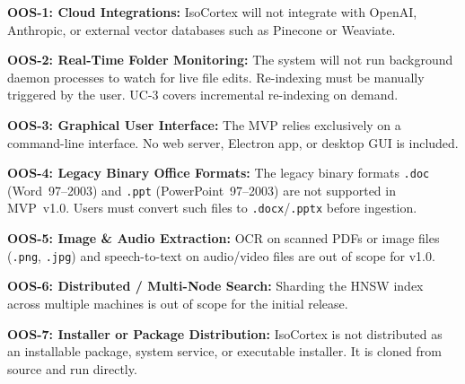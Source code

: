 \documentclass[12pt, a4paper]{article}
\begin{document}
\vspace{0.3cm}
\begin{tcolorbox}[enhanced, colback=white, colframe=alertRed,
    colbacktitle=red!5, coltitle=alertRed, boxrule=0.5pt, leftrule=4pt,
    arc=2mm, fonttitle=\large\bfseries, title={System Exclusions},
    drop fuzzy shadow=black!5!white, top=5pt, bottom=5pt]
\begin{prolist}
    \item \textbf{OOS-1: Cloud Integrations:} IsoCortex will not integrate
    with OpenAI, Anthropic, or external vector databases such as Pinecone
    or Weaviate.

    \item \textbf{OOS-2: Real-Time Folder Monitoring:} The system will not
    run background daemon processes to watch for live file edits.
    Re-indexing must be manually triggered by the user. UC-3 covers
    incremental re-indexing on demand.

    \item \textbf{OOS-3: Graphical User Interface:} The MVP relies
    exclusively on a command-line interface. No web server, Electron app,
    or desktop GUI is included.

    \item \textbf{OOS-4: Legacy Binary Office Formats:} The legacy binary
    formats \texttt{.doc} (Word~97--2003) and \texttt{.ppt}
    (PowerPoint~97--2003) are not supported in MVP~v1.0. Users must convert
    such files to \texttt{.docx}/\texttt{.pptx} before ingestion.

    \item \textbf{OOS-5: Image \& Audio Extraction:} OCR on scanned PDFs
    or image files (\texttt{.png}, \texttt{.jpg}) and speech-to-text on
    audio/video files are out of scope for v1.0.

    \item \textbf{OOS-6: Distributed / Multi-Node Search:} Sharding the
    HNSW index across multiple machines is out of scope for the initial
    release.

    \item \textbf{OOS-7: Installer or Package Distribution:} IsoCortex is
    not distributed as an installable package, system service, or
    executable installer. It is cloned from source and run directly.
\end{prolist}
\end{tcolorbox}

\end{document}
